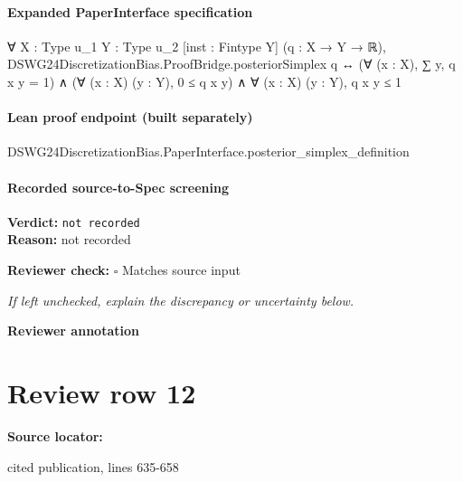 \documentclass[10pt]{article}
\newcommand{\reviewerbox}{%
  \par\noindent\fbox{\parbox{0.96\linewidth}{\rule{0pt}{0.38in}}}\par
}
\newcommand{\reviewmatch}[1]{%
  \par\noindent\textbf{Reviewer check:} $\square$\; #1\par
  \noindent\emph{If left unchecked, explain the discrepancy or uncertainty below.}\par
}
\begin{document}
\paragraph{Expanded PaperInterface specification}
\begin{ReviewVerbatim}
∀ {X : Type u_1} {Y : Type u_2} [inst : Fintype Y] (q : X → Y → ℝ),
  DSWG24DiscretizationBias.ProofBridge.posteriorSimplex q ↔
    (∀ (x : X), ∑ y, q x y = 1) ∧ (∀ (x : X) (y : Y), 0 ≤ q x y) ∧ ∀ (x : X) (y : Y), q x y ≤ 1
\end{ReviewVerbatim}

\paragraph{Lean proof endpoint (built separately)}\begin{ReviewVerbatim}
DSWG24DiscretizationBias.PaperInterface.posterior_simplex_definition
\end{ReviewVerbatim}

\paragraph{Recorded source-to-Spec screening}
\textbf{Verdict:} \texttt{not recorded}
\\
\textbf{Reason:} not recorded
\reviewmatch{Matches source input}
\noindent\textbf{Reviewer annotation}\par
\reviewerbox
\clearpage
\hypertarget{source-claim-54a3ee9bbb8f086b}{}
\section*{Review row 12}
\textbf{Source locator:} {\footnotesize\raggedright cited publication, lines 635-\allowbreak{}658\par}
\end{document}
